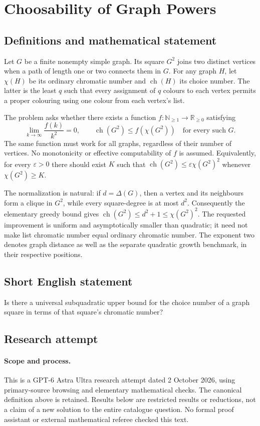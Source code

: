 \documentclass[11pt,a4paper]{article}
\begin{document}
\section*{Choosability of Graph Powers}\label{statement}

\subsection{Definitions and mathematical statement}
Let $G$ be a finite nonempty simple graph. Its square $G^2$ joins two
distinct vertices when a path of length one or two connects them in $G$.
For any graph $H$, let $\chi(H)$ be its ordinary chromatic number and
$\operatorname{ch}(H)$ its choice number. The latter is the least $q$
such that every assignment of $q$ colours to each vertex permits a proper
colouring using one colour from each vertex's list.

The problem asks whether there exists a function
$f:\mathbb N_{\ge1}\to\mathbb R_{\ge0}$ satisfying
\[
 \lim_{k\to\infty}\frac{f(k)}{k^2}=0,
 \qquad
 \operatorname{ch}(G^2)\le f(\chi(G^2))
 \quad\text{for every such }G.
\]
The same function must work for all graphs, regardless of their number
of vertices. No monotonicity or effective computability of $f$ is assumed.
Equivalently, for every $\varepsilon>0$ there should exist $K$ such that
$\operatorname{ch}(G^2)\le\varepsilon\chi(G^2)^2$ whenever
$\chi(G^2)\ge K$.

The normalization is natural: if $d=\Delta(G)$, then a vertex and its
neighbours form a clique in $G^2$, while every square-degree is at most
$d^2$. Consequently the elementary greedy bound gives
$\operatorname{ch}(G^2)\le d^2+1\le\chi(G^2)^2$.
The requested improvement is uniform and asymptotically smaller than
quadratic; it need not make list chromatic number equal ordinary
chromatic number. The exponent two denotes graph distance as well as
the separate quadratic growth benchmark, in their respective positions.
\subsection{Short English statement}
Is there a universal subquadratic upper bound for the choice number of a graph square in terms of that square’s chromatic number?
\subsection{Research attempt}
\paragraph{Scope and process.}
This is a GPT-6 Astra Ultra research attempt dated 2 October 2026, using
primary-source browsing and elementary mathematical checks. The canonical
definition above is retained. Results below are restricted results or
reductions, not a claim of a new solution to the entire catalogue question.
No formal proof assistant or external mathematical referee checked this text.
\end{document}
